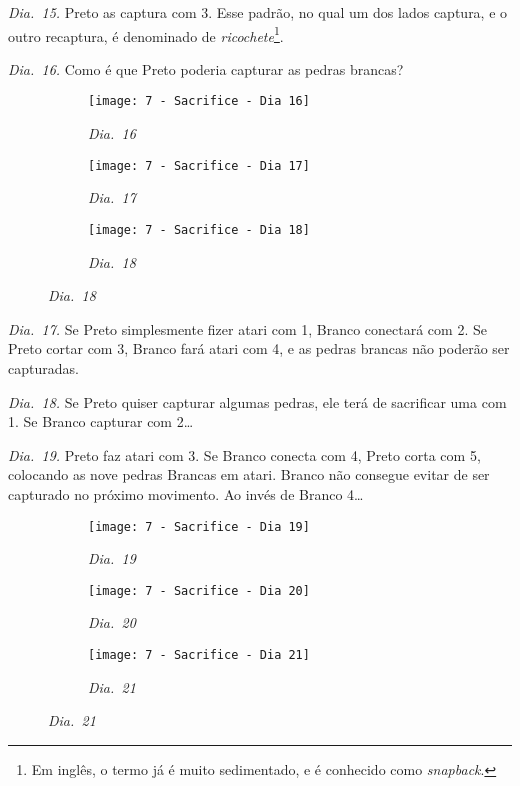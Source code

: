 \emph{Dia.\@~15.} Preto as captura com 3. Esse padrão, no qual um dos lados captura, e o outro recaptura, é denominado de \emph{ricochete}\footnote{Em inglês, o termo já é muito sedimentado, e é conhecido como \emph{snapback}.}.

\pagebreak

\emph{Dia.\@~16.} Como é que Preto poderia capturar as pedras brancas?

\begin{figure}[h!]
    \centering
    \begin{subfigure}[t]{.31\textwidth}
        \texttt{[image: 7 - Sacrifice - Dia 16]}
        \captionsetup{justification=centering}
        \caption*{\emph{Dia.\@~16}}
    \end{subfigure}
    \hfill
    \begin{subfigure}[t]{.31\textwidth}
        \texttt{[image: 7 - Sacrifice - Dia 17]}
        \captionsetup{justification=centering}
        \caption*{\emph{Dia.\@~17}}
    \end{subfigure}
    \hfill
    \begin{subfigure}[t]{.31\textwidth}
        \texttt{[image: 7 - Sacrifice - Dia 18]}
        \captionsetup{justification=centering}
        \caption*{\emph{Dia.\@~18}}
    \end{subfigure}
\end{figure}

\emph{Dia.\@~17.} Se Preto simplesmente fizer atari com 1, Branco conectará com 2. Se Preto cortar com 3, Branco fará atari com 4, e as pedras brancas não poderão ser capturadas.

\emph{Dia.\@~18.} Se Preto quiser capturar algumas pedras, ele terá de sacrificar uma com 1. Se Branco capturar com 2\ldots

\emph{Dia.\@~19.} Preto faz atari com 3. Se Branco conecta com 4, Preto corta com 5, colocando as nove pedras Brancas em atari. Branco não consegue evitar de ser capturado no próximo movimento. Ao invés de Branco 4\ldots

\begin{figure}[h!]
    \centering
    \begin{subfigure}[t]{.31\textwidth}
        \texttt{[image: 7 - Sacrifice - Dia 19]}
        \captionsetup{justification=centering}
        \caption*{\emph{Dia.\@~19}}
    \end{subfigure}
    \hfill
    \begin{subfigure}[t]{.31\textwidth}
        \texttt{[image: 7 - Sacrifice - Dia 20]}
        \captionsetup{justification=centering}
        \caption*{\emph{Dia.\@~20}}
    \end{subfigure}
    \hfill
    \begin{subfigure}[t]{.31\textwidth}
        \texttt{[image: 7 - Sacrifice - Dia 21]}
        \captionsetup{justification=centering}
        \caption*{\emph{Dia.\@~21}}
    \end{subfigure}
\end{figure}

